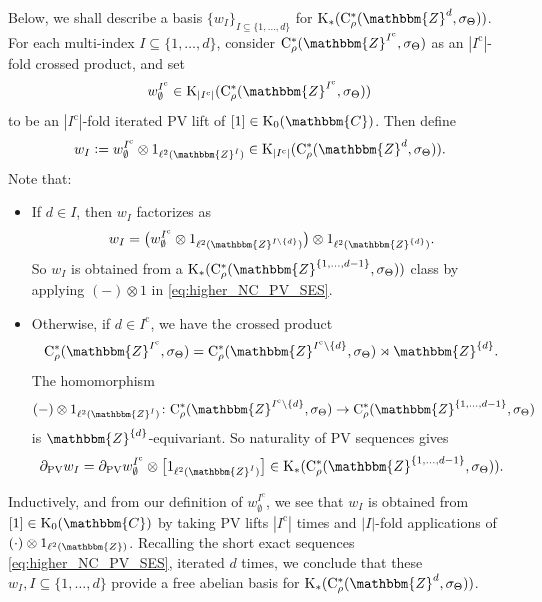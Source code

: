 \documentclass{amsart}
\numberwithin{figure}{section}
\numberwithin{equation}{section}
\numberwithin{table}{section}
\theoremstyle{plain}
\theoremstyle{definition}
\theoremstyle{remark}
\theoremstyle{nonumber}
\newcommand{\Z}{\mathbb{Z}}
\newcommand{\C}{\mathbb{C}}
\newcommand{\K}{\relax\ifmmode\operatorname{K}\else\textup{K}\fi}
\newcommand{\Cst}{\relax\ifmmode\mathrm{C}^*\else\textup{C*}\fi}
\newcommand{\Cstr}{\Cst_\rho} %
\newcommand{\defeq}{\mathrel{\vcentcolon=}}
\newcommand{\blank}{-}
\renewcommand{\mathbb}{\mathbbm} %
\begin{document}
Below, we shall describe a basis $\{w_I\}_{I\subseteq\{1,\ldots,d\}}$ for $\K_*(\Cstr(\Z^d,\sigma_\Theta))$. For each multi-index $I\subseteq\{1,\ldots,d\}$, consider $\Cstr(\Z^{I^\mathrm{c}},\sigma_\Theta)$ as an $|I^\mathrm{c}|$-fold crossed product, and set
\begin{equation}\label{eq:PV.lift.iterated}
w^{I^\mathrm{c}}_\emptyset\in \K_{|I^\mathrm{c}|}(\Cstr(\Z^{I^\mathrm{c}},\sigma_\Theta))
\end{equation}
to be an $|I^\mathrm{c}|$-fold iterated PV lift of $[1]\in\K_0(\C)$. Then define
\begin{equation}\label{eq:higher_NC_basis_choice}
w_I\defeq w^{I^\mathrm{c}}_\emptyset\otimes 1_{\ell^2(\Z^I)}\in\K_{|I^\mathrm{c}|}(\Cstr(\Z^d,\sigma_\Theta)).
\end{equation}
Note that:
\begin{itemize}
\item If $d\in I$, then $w_I$ factorizes as
\begin{equation*}
w_I=\big(w^{I^\mathrm{c}}_\emptyset\otimes 1_{\ell^2(\Z^{I\setminus\{d\}})}\big)\otimes 1_{\ell^2(\Z^{\{d\}})}.
\end{equation*}
So $w_I$ is obtained from a $\K_*(\Cstr(\Z^{\{1,\ldots,d-1\}},\sigma_\Theta))$ class by applying $(\blank)\otimes 1$ in \eqref{eq:higher_NC_PV_SES}.
\item Otherwise, if $d\in I^\mathrm{c}$, we have the crossed product
\[
\Cstr(\Z^{I^\mathrm{c}},\sigma_\Theta)=\Cstr(\Z^{I^\mathrm{c}\setminus\{d\}},\sigma_\Theta)\rtimes\Z^{\{d\}}.
\]
The homomorphism
\[
(\blank)\otimes 1_{\ell^2(\Z^I)}\colon \Cstr(\Z^{I^\mathrm{c}\setminus\{d\}},\sigma_\Theta)\to \Cstr(\Z^{\{1,\ldots,d-1\}},\sigma_\Theta)
\]
is $\Z^{\{d\}}$-equivariant. So naturality of PV sequences gives
\[
\partial_{{\rm PV}} w_I=\partial_{{\rm PV}} w_\emptyset^{I^\mathrm{c}}\otimes \big[1_{\ell^2(\Z^I)}\big]\in \K_*(\Cstr(\Z^{\{1,\ldots,d-1\}},\sigma_\Theta)).
\]
\end{itemize}
Inductively, and from our definition of $w_\emptyset^{I^\mathrm{c}}$, we see that $w_I$ is obtained from $[1]\in\K_0(\C)$ by taking PV lifts $|I^\mathrm{c}|$ times and $|I|$-fold applications of $(\cdot)\otimes 1_{\ell^2(\Z)}$. Recalling the short exact sequences \eqref{eq:higher_NC_PV_SES}, iterated $d$ times, we conclude that these $w_I, I\subseteq\{1,\ldots,d\}$ provide a free abelian basis for $\K_*(\Cstr(\Z^d,\sigma_\Theta))$.
\end{document}
